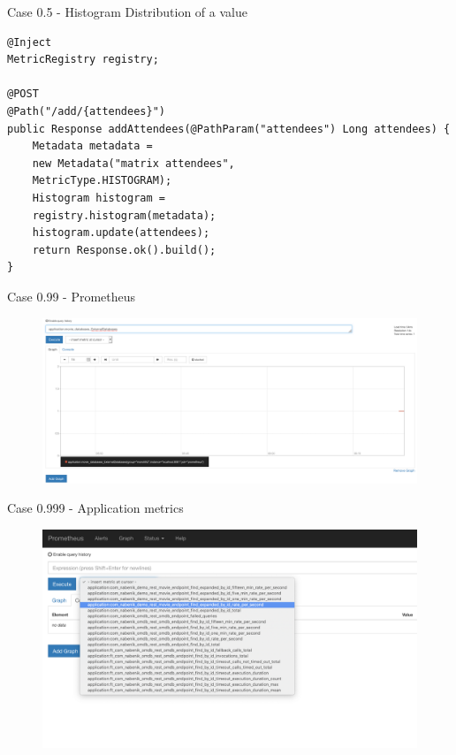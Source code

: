 \documentclass{beamer}
\begin{document}
\begin{frame}[fragile]{Case 0.5 - Histogram}
Distribution of a value
\begin{lstlisting}
@Inject
MetricRegistry registry;

@POST
@Path("/add/{attendees}")
public Response addAttendees(@PathParam("attendees") Long attendees) {
	Metadata metadata =
	new Metadata("matrix attendees",
	MetricType.HISTOGRAM);
	Histogram histogram = 
	registry.histogram(metadata);
	histogram.update(attendees);
	return Response.ok().build();
}
\end{lstlisting}

\end{frame}

\begin{frame}[fragile]{Case 0.99 - Prometheus}
\begin{figure}
	\centering
	\includegraphics[width=\linewidth]{Images/gauge}
\end{figure}

\end{frame}

\begin{frame}{Case 0.999 - Application metrics}
\begin{figure}
	\centering
	\includegraphics[width=\linewidth]{Images/micrometric1}
\end{figure}

\end{frame}
\end{document}
